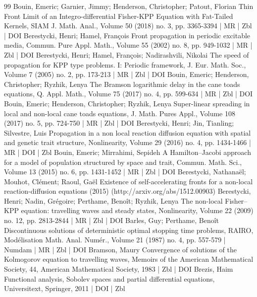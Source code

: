\begin{thebibliography}{99}
Bouin, Emeric; Garnier, Jimmy; Henderson, Christopher; Patout, Florian Thin Front Limit of an Integro-differential Fisher-KPP Equation with Fat-Tailed Kernels, SIAM J. Math. Anal., Volume 50 (2018) no. 3, pp. 3365-3394 | MR | Zbl | DOI
Berestycki, Henri; Hamel, François Front propagation in periodic excitable media, Commun. Pure Appl. Math., Volume 55 (2002) no. 8, pp. 949-1032 | MR | Zbl | DOI
Berestycki, Henri; Hamel, François; Nadirashvili, Nikolai The speed of propagation for KPP type problems. I: Periodic framework, J. Eur. Math. Soc., Volume 7 (2005) no. 2, pp. 173-213 | MR | Zbl | DOI
Bouin, Emeric; Henderson, Christopher; Ryzhik, Lenya The Bramson logarithmic delay in the cane toads equations, Q. Appl. Math., Volume 75 (2017) no. 4, pp. 599-634 | MR | Zbl | DOI
Bouin, Emeric; Henderson, Christopher; Ryzhik, Lenya Super-linear spreading in local and non-local cane toads equations, J. Math. Pures Appl., Volume 108 (2017) no. 5, pp. 724-750 | MR | Zbl | DOI
Berestycki, Henri; Jin, Tianling; Silvestre, Luis Propagation in a non local reaction diffusion equation with spatial and genetic trait structure, Nonlinearity, Volume 29 (2016) no. 4, pp. 1434-1466 | MR | DOI | Zbl
Bouin, Emeric; Mirrahimi, Sepideh A Hamilton–Jacobi approach for a model of population structured by space and trait, Commun. Math. Sci., Volume 13 (2015) no. 6, pp. 1431-1452 | MR | Zbl | DOI
Berestycki, Nathanaël; Mouhot, Clément; Raoul, Gaël Existence of self-accelerating fronts for a non-local reaction-diffusion equations (2015) (http://arxiv.org/abs/1512.00903)
Berestycki, Henri; Nadin, Grégoire; Perthame, Benoît; Ryzhik, Lenya The non-local Fisher–KPP equation: travelling waves and steady states, Nonlinearity, Volume 22 (2009) no. 12, pp. 2813-2844 | MR | Zbl | DOI
Barles, Guy; Perthame, Benoît Discontinuous solutions of deterministic optimal stopping time problems, RAIRO, Modélisation Math. Anal. Numér., Volume 21 (1987) no. 4, pp. 557-579 | Numdam | MR | Zbl | DOI
Bramson, Maury Convergence of solutions of the Kolmogorov equation to travelling waves, Memoirs of the American Mathematical Society, 44, American Mathematical Society, 1983 | Zbl | DOI
Brezis, Haim Functional analysis, Sobolev spaces and partial differential equations, Universitext, Springer, 2011 | DOI | Zbl

\end{thebibliography}

